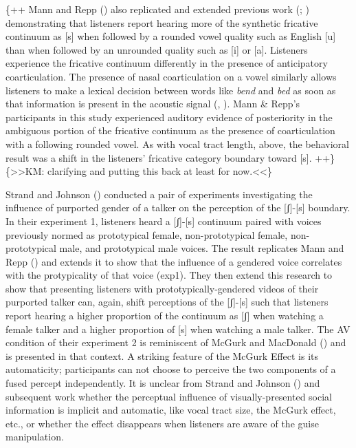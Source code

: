 \documentclass[
  man,
  longtable,
  nolmodern,
  notxfonts,
  notimes,
  colorlinks=true,linkcolor=blue,citecolor=blue,urlcolor=blue]{apa7}
\begin{document}
\{++ Mann and Repp () also replicated
and extended previous work (; )
demonstrating that listeners report hearing more of the synthetic
fricative continuum as {[}s{]} when followed by a rounded vowel quality
such as English {[}u{]} than when followed by an unrounded quality such
as {[}i{]} or {[}a{]}. Listeners experience the fricative continuum
differently in the presence of anticipatory coarticulation. The presence
of nasal coarticulation on a vowel similarly allows listeners to make a
lexical decision between words like \emph{bend} and \emph{bed} as soon
as that information is present in the acoustic signal
(, ). Mann
\& Repp's participants in this study experienced auditory evidence of
posteriority in the ambiguous portion of the fricative continuum as the
presence of coarticulation with a following rounded vowel. As with vocal
tract length, above, the behavioral result was a shift in the listeners'
fricative category boundary toward {[}s{]}.
++\}\{\textgreater\textgreater KM: clarifying and putting this back at
least for now.\textless\textless\}

Strand and Johnson () conducted a
pair of experiments investigating the influence of purported gender of a
talker on the perception of the {[}ʃ{]}-{[}s{]} boundary. In their
experiment 1, listeners heard a {[}ʃ{]}-{[}s{]} continuum paired with
voices previously normed as prototypical female, non-prototypical
female, non-prototypical male, and prototypical male voices. The result
replicates Mann and Repp () and extends
it to show that the influence of a gendered voice correlates with the
protypicality of that voice (exp1). They then extend this research to
show that presenting listeners with prototypically-gendered videos of
their purported talker can, again, shift perceptions of the
{[}ʃ{]}-{[}s{]} such that listeners report hearing a higher proportion
of the continuum as {[}ʃ{]} when watching a female talker and a higher
proportion of {[}s{]} when watching a male talker. The AV condition of
their experiment 2 is reminiscent of McGurk and MacDonald
() and is presented in that
context. A striking feature of the McGurk Effect is its automaticity;
participants can not choose to perceive the two components of a fused
percept independently. It is unclear from Strand and Johnson
() and subsequent work whether the
perceptual influence of visually-presented social information is
implicit and automatic, like vocal tract size, the McGurk effect, etc.,
or whether the effect disappears when listeners are aware of the guise
manipulation.
\end{document}
